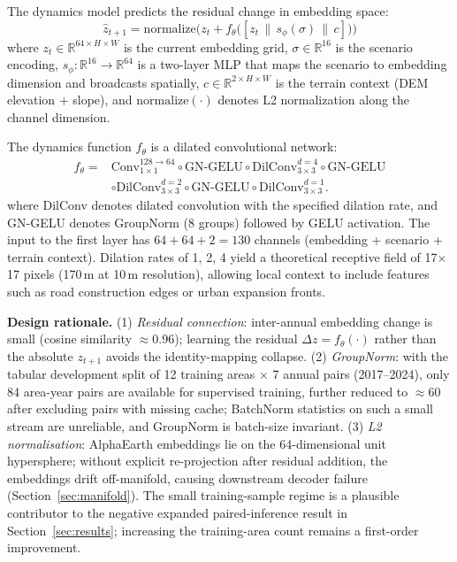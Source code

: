 \documentclass{article}
\begin{document}
The dynamics model predicts the residual change in embedding space:
\begin{equation}
\hat{z}_{t+1} = \text{normalize}\Big(z_t + f_\theta\big([z_t \,\|\, s_\phi(\sigma) \,\|\, c]\big)\Big)
\label{eq:dynamics}
\end{equation}
where $z_t \in \mathbb{R}^{64 \times H \times W}$ is the current embedding grid, $\sigma \in \mathbb{R}^{16}$ is the scenario encoding, $s_\phi: \mathbb{R}^{16} \to \mathbb{R}^{64}$ is a two-layer MLP that maps the scenario to embedding dimension and broadcasts spatially, $c \in \mathbb{R}^{2 \times H \times W}$ is the terrain context (DEM elevation + slope), and $\text{normalize}(\cdot)$ denotes L2 normalization along the channel dimension.

The dynamics function $f_\theta$ is a dilated convolutional network:
\begin{equation}
\begin{aligned}
f_\theta ={}& \text{Conv}_{1\times1}^{128 \to 64} \circ \text{GN-GELU}
\circ \text{DilConv}_{3\times3}^{d=4} \circ \text{GN-GELU} \\
& \circ \text{DilConv}_{3\times3}^{d=2} \circ \text{GN-GELU}
\circ \text{DilConv}_{3\times3}^{d=1}.
\end{aligned}
\end{equation}
where DilConv denotes dilated convolution with the specified dilation rate, and GN-GELU denotes GroupNorm (8 groups) followed by GELU activation. The input to the first layer has $64 + 64 + 2 = 130$ channels (embedding + scenario + terrain context). Dilation rates of 1, 2, 4 yield a theoretical receptive field of 17$\times$17 pixels (170\,m at 10\,m resolution), allowing local context to include features such as road construction edges or urban expansion fronts.

\textbf{Design rationale.} (1) \textit{Residual connection}: inter-annual embedding change is small (cosine similarity $\approx$0.96); learning the residual $\Delta z = f_\theta(\cdot)$ rather than the absolute $z_{t+1}$ avoids the identity-mapping collapse. (2) \textit{GroupNorm}: with the tabular development split of 12 training areas $\times$ 7 annual pairs (2017--2024), only 84 area-year pairs are available for supervised training, further reduced to $\approx$60 after excluding pairs with missing cache; BatchNorm statistics on such a small stream are unreliable, and GroupNorm is batch-size invariant. (3) \textit{L2 normalisation}: AlphaEarth embeddings lie on the 64-dimensional unit hypersphere; without explicit re-projection after residual addition, the embeddings drift off-manifold, causing downstream decoder failure (Section~\ref{sec:manifold}). The small training-sample regime is a plausible contributor to the negative expanded paired-inference result in Section~\ref{sec:results}; increasing the training-area count remains a first-order improvement.
\end{document}
